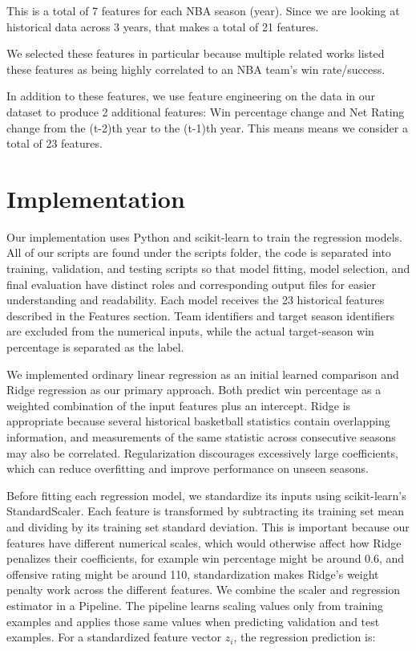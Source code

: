 \documentclass[11pt]{article}
\begin{document}
This is a total of 7 features for each NBA season (year). Since we are looking at historical data across 3 years, that makes a total of 21 features.
\medskip

We selected these features in particular because multiple related works listed these features as being highly correlated to an NBA team's win rate/success.
\medskip

In addition to these features, we use feature engineering on the data in our dataset to produce 2 additional features: Win percentage change and Net Rating change from the (t-2)th year to the (t-1)th year. This means means we consider a total of 23 features.


\section{Implementation}

Our implementation uses Python and scikit-learn to train the regression models. All of our scripts are found under the scripts folder, the code is separated into training, validation, and testing scripts so that model fitting, model selection, and final evaluation have distinct roles and corresponding output files for easier understanding and readability. Each model receives the 23 historical features described in the Features section. Team identifiers and target season identifiers are excluded from the numerical inputs, while the actual target-season win percentage is separated as the label.
\medskip

We implemented ordinary linear regression as an initial learned comparison and Ridge regression as our primary approach. Both predict win percentage as a weighted combination of the input features plus an intercept. Ridge is appropriate because several historical basketball statistics contain overlapping information, and measurements of the same statistic across consecutive seasons may also be correlated. Regularization discourages excessively large coefficients, which can reduce overfitting and improve performance on unseen seasons.
\medskip

Before fitting each regression model, we standardize its inputs using scikit-learn’s StandardScaler. Each feature is transformed by subtracting its training set mean and dividing by its training set standard deviation. This is important because our features have different numerical scales, which would otherwise affect how Ridge penalizes their coefficients, for example win percentage might be around 0.6, and offensive rating might be around 110, standardization makes Ridge’s weight penalty work across the different features. We combine the scaler and regression estimator in a Pipeline. The pipeline learns scaling values only from training examples and applies those same values when predicting validation and test examples.
For a standardized feature vector $z_i$, the regression prediction is:
\end{document}
